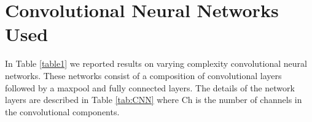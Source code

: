 






\section{Convolutional Neural Networks Used} \label{appendix:CNNs}
In Table \ref{table1} we reported results on varying complexity convolutional neural networks. These networks consist of a composition of convolutional layers followed by a maxpool and fully connected layers. 
The details of the network layers are described in Table \ref{tab:CNN} where Ch is the number of channels in the convolutional components. %

